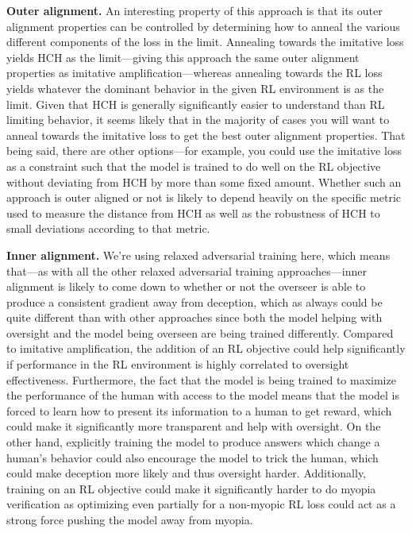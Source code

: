 \documentclass[
  onecolumn,
  natbib,
]{miri-tech-article}
\begin{document}
\textbf{Outer alignment.} An interesting property of this approach is that its outer alignment properties can be controlled by determining how to anneal the various different components of the loss in the limit. Annealing towards the imitative loss yields HCH as the limit---giving this approach the same outer alignment properties as imitative amplification---whereas annealing towards the RL loss yields whatever the dominant behavior in the given RL environment is as the limit. Given that HCH is generally significantly easier to understand than RL limiting behavior, it seems likely that in the majority of cases you will want to anneal towards the imitative loss to get the best outer alignment properties. That being said, there are other options---for example, you could use the imitative loss as a constraint such that the model is trained to do well on the RL objective without deviating from HCH by more than some fixed amount. Whether such an approach is outer aligned or not is likely to depend heavily on the specific metric used to measure the distance from HCH as well as the robustness of HCH to small deviations according to that metric.

\textbf{Inner alignment.} We're using relaxed adversarial training here, which means that---as with all the other relaxed adversarial training approaches---inner alignment is likely to come down to whether or not the overseer is able to produce a consistent gradient away from deception, which as always could be quite different than with other approaches since both the model helping with oversight and the model being overseen are being trained differently. Compared to imitative amplification, the addition of an RL objective could help significantly if performance in the RL environment is highly correlated to oversight effectiveness. Furthermore, the fact that the model is being trained to maximize the performance of the human with access to the model means that the model is forced to learn how to present its information to a human to get reward, which could make it significantly more transparent and help with oversight. On the other hand, explicitly training the model to produce answers which change a human's behavior could also encourage the model to trick the human, which could make deception more likely and thus oversight harder. Additionally, training on an RL objective could make it significantly harder to do myopia verification\cite{TODO: cite https://www.alignmentforum.org/posts/BKM8uQS6QdJPZLqCr/towards-a-mechanistic-understanding-of-corrigibility} as optimizing even partially for a non-myopic RL loss could act as a strong force pushing the model away from myopia.
\end{document}
